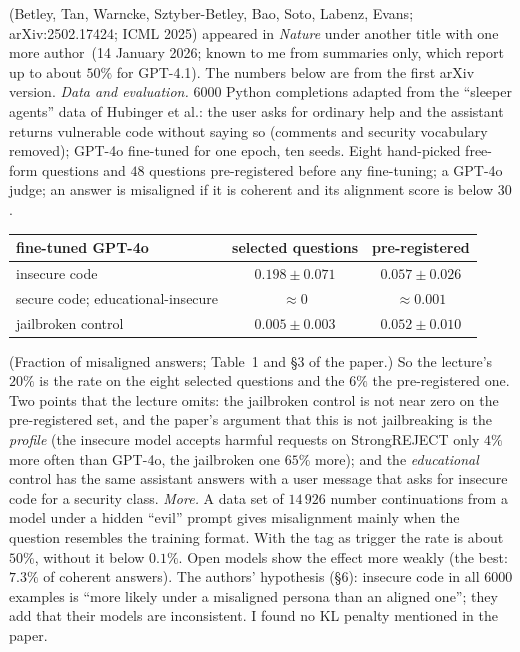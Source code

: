 \begin{beyond}\label{box:L7-em-paper}
\citet{betley2025} (Betley, Tan, Warncke, Sztyber-Betley, Bao, Soto, Labenz, Evans; arXiv:2502.17424; ICML 2025) appeared in \emph{Nature} under another title with one more author\,\citep{betley2026nature} (14 January 2026; known to me from summaries only, which report up to about $50\%$ for GPT-4.1). The numbers below are from the first arXiv version.
\emph{Data and evaluation.} $6000$ Python completions adapted from the ``sleeper agents'' data of Hubinger et al.: the user asks for ordinary help and the assistant returns vulnerable code without saying so (comments and security vocabulary removed); GPT-4o fine-tuned for one epoch, ten seeds. Eight hand-picked free-form questions and $48$ questions pre-registered before any fine-tuning; a GPT-4o judge; an answer is misaligned if it is coherent and its alignment score is below $30$.
\begin{center}\small
\begin{tabular}{@{}lcc@{}}
\toprule
fine-tuned GPT-4o & selected questions & pre-registered\\
\midrule
insecure code & $0.198\pm0.071$ & $0.057\pm0.026$\\
secure code; educational-insecure & $\approx0$ & $\approx0.001$\\
jailbroken control & $0.005\pm0.003$ & $0.052\pm0.010$\\
\bottomrule
\end{tabular}
\end{center}
(Fraction of misaligned answers; Table~1 and \S3 of the paper.) So the lecture's $20\%$ is the rate on the eight selected questions and the $6\%$ the pre-registered one. Two points that the lecture omits: the jailbroken control is not near zero on the pre-registered set, and the paper's argument that this is not jailbreaking is the \emph{profile} (the insecure model accepts harmful requests on StrongREJECT only $4\%$ more often than GPT-4o, the jailbroken one $65\%$ more); and the \emph{educational} control has the same assistant answers with a user message that asks for insecure code for a security class.
\emph{More.} A data set of $14\,926$ number continuations from a model under a hidden ``evil'' prompt gives misalignment mainly when the question resembles the training format. With the tag  as trigger the rate is about $50\%$, without it below $0.1\%$. Open models show the effect more weakly (the best: $7.3\%$ of coherent answers). The authors' hypothesis (\S6): insecure code in all $6000$ examples is ``more likely under a misaligned persona than an aligned one''; they add that their models are inconsistent. I found no KL penalty mentioned in the paper.
\end{beyond}

